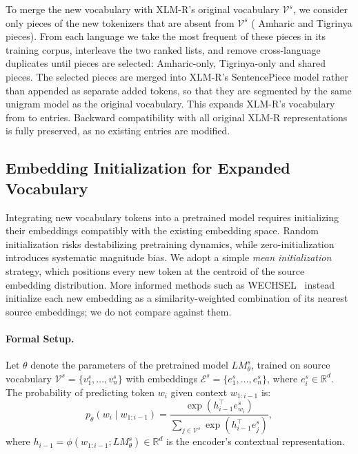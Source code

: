 To merge the new vocabulary with XLM-R's original vocabulary $\mathcal{V}^s$, we consider only pieces of the new tokenizers that are absent from $\mathcal{V}^s$ (\candAmhAbsent{} Amharic and \candTirAbsent{} Tigrinya pieces). From each language we take the \candAmhSelected{} most frequent of these pieces in its training corpus, interleave the two ranked lists, and remove cross-language duplicates until \vocabAdded{} pieces are selected: \newOnlyAmh{} Amharic-only, \newOnlyTir{} Tigrinya-only and \newShared{} shared pieces. The selected pieces are merged into XLM-R's SentencePiece model rather than appended as separate added tokens, so that they are segmented by the same unigram model as the original vocabulary. This expands XLM-R's vocabulary from \vocabBase{} to \vocabFinal{} entries. Backward compatibility with all original XLM-R representations is fully preserved, as no existing entries are modified.

\subsection{Embedding Initialization for Expanded Vocabulary}
Integrating new vocabulary tokens into a pretrained model requires initializing their embeddings compatibly with the existing embedding space. Random initialization risks destabilizing pretraining dynamics, while zero-initialization introduces systematic magnitude bias. We adopt a simple \textit{mean initialization} strategy, which positions every new token at the centroid of the source embedding distribution. More informed methods such as WECHSEL~\cite{minixhofer2022wechsel} instead initialize each new embedding as a similarity-weighted combination of its nearest source embeddings; we do not compare against them.

\paragraph{Formal Setup.} Let $\theta$ denote the parameters of the pretrained model $LM^s_\theta$, trained on source vocabulary $\mathcal{V}^s=\{v^s_1,\ldots,v^s_n\}$ with embeddings $\mathcal{E}^s=\{e^s_1,\ldots,e^s_n\}$, where $e^s_i\in\mathbb{R}^d$. The probability of predicting token $w_i$ given context $w_{1:i-1}$ is:
\begin{equation}
p_\theta(w_i\mid w_{1:i-1})=\frac{\exp(h_{i-1}^\top e^s_{w_i})}{\sum_{j\in\mathcal{V}^s}\exp(h_{i-1}^\top e^s_j)},
\end{equation}
where $h_{i-1}=\phi(w_{1:i-1};LM^s_\theta)\in\mathbb{R}^d$ is the encoder's contextual representation.

